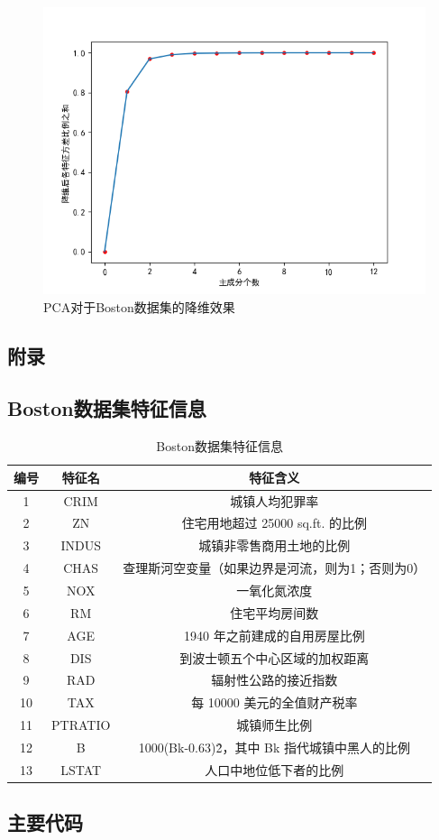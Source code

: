 \documentclass[12pt,a4paper]{article}
\theoremstyle{definition}
\begin{document}
\begin{figure}[H]
	\centering
	\includegraphics[width=0.73\linewidth]{img/kline.png}
	\caption{PCA对于Boston数据集的降维效果}
	\label{fig::kline}
\end{figure}


\newpage
\begin{appendix}
	\section{附录}
	\subsection{Boston数据集特征信息}
	\label{apd:boston_char}
	\begin{table}[H]
		\renewcommand\arraystretch{1.35}
		\caption{Boston数据集特征信息}
		\label{tab:boston_char}
		\centering
		
		\begin{tabular}{c|c|c}
			\centering
			编号 & 特征名 & 特征含义 \\
			\hline
			1 & CRIM & 城镇人均犯罪率 \\
			2 & ZN & 住宅用地超过 25000 sq.ft. 的比例 \\
			3 & INDUS & 城镇非零售商用土地的比例 \\
			4 & CHAS & 查理斯河空变量（如果边界是河流，则为1；否则为0） \\
			5 & NOX & 一氧化氮浓度 \\
			6 & RM & 住宅平均房间数 \\
			7 & AGE & 1940 年之前建成的自用房屋比例 \\
			8 & DIS & 到波士顿五个中心区域的加权距离 \\
			9 & RAD & 辐射性公路的接近指数 \\
			10 & TAX & 每 10000 美元的全值财产税率 \\
			11 & PTRATIO & 城镇师生比例 \\
			12 & B & 1000(Bk-0.63)\^ 2，其中 Bk 指代城镇中黑人的比例 \\
			13 & LSTAT & 人口中地位低下者的比例 \\			
		\end{tabular}
	\end{table}
	
	\subsection{主要代码}
	\label{apd:code}
	
\end{appendix}

\end{document}
